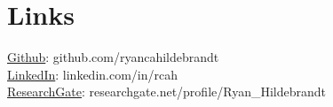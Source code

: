 \documentclass[letterpaper]{deedy-resume_sm} %
\begin{document}
\section{Links} 
\href{https://github.com/ryancahildebrandt}{Github}: github.com/ryancahildebrandt \\
\href{https://linkedin.com/in/rcah}{LinkedIn}: linkedin.com/in/rcah \\
\href{https://researchgate.net/profile/Ryan\_Hildebrandt}{ResearchGate}: researchgate.net/profile/Ryan\_Hildebrandt 
\sectionspace %
\hfill
\end{document}
